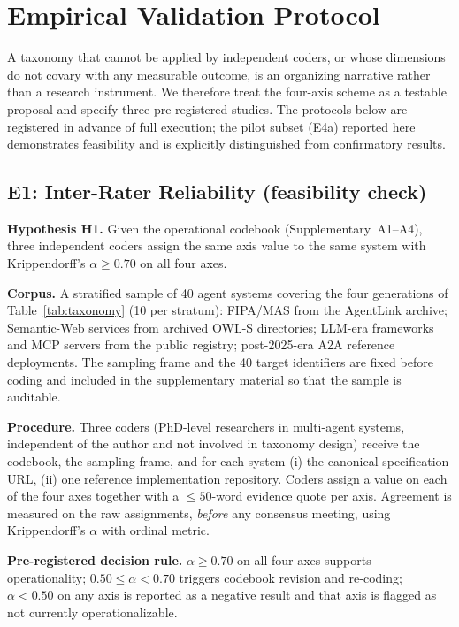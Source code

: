 \documentclass[10pt,twocolumn]{article}
\begin{document}
\section{Empirical Validation Protocol}\label{sec:validation}

A taxonomy that cannot be applied by independent coders, or whose dimensions do not covary with any measurable outcome, is an organizing narrative rather than a research instrument.  We therefore treat the four-axis scheme as a testable proposal and specify three pre-registered studies.  The protocols below are registered in advance of full execution; the pilot subset (E4a) reported here demonstrates feasibility and is explicitly distinguished from confirmatory results.

\subsection{E1: Inter-Rater Reliability (feasibility check)}

\textbf{Hypothesis H1.} Given the operational codebook (Supplementary \textsection\,A1--A4), three independent coders assign the same axis value to the same system with Krippendorff's $\alpha \geq 0.70$ on all four axes.

\textbf{Corpus.} A stratified sample of 40 agent systems covering the four generations of Table~\ref{tab:taxonomy} (10 per stratum): FIPA/MAS from the AgentLink archive; Semantic-Web services from archived OWL-S directories; LLM-era frameworks and MCP servers from the public registry; post-2025-era A2A reference deployments.  The sampling frame and the 40 target identifiers are fixed before coding and included in the supplementary material so that the sample is auditable.

\textbf{Procedure.}  Three coders (PhD-level researchers in multi-agent systems, independent of the author and not involved in taxonomy design) receive the codebook, the sampling frame, and for each system (i) the canonical specification URL, (ii) one reference implementation repository.  Coders assign a value on each of the four axes together with a $\leq 50$-word evidence quote per axis.  Agreement is measured on the raw assignments, \emph{before} any consensus meeting, using Krippendorff's $\alpha$ with ordinal metric.

\textbf{Pre-registered decision rule.}  $\alpha \geq 0.70$ on all four axes supports operationality; $0.50 \leq \alpha < 0.70$ triggers codebook revision and re-coding; $\alpha < 0.50$ on any axis is reported as a negative result and that axis is flagged as not currently operationalizable.
\end{document}
